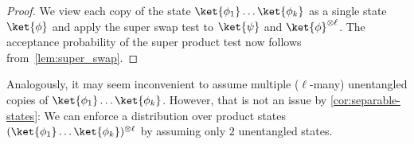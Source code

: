 \begin{proof}
  We view each copy of the state $\ket{\phi_1}\ldots\ket{\phi_k}$ as a single state $\ket{\phi}$
  and apply the super swap test to $\ket{\psi}$ and $\ket{\phi}^{\otimes \ell}$. The acceptance  
  probability of the super product test now follows from~\cref{lem:super_swap}.
\end{proof}

Analogously, it may seem inconvenient to assume multiple ($\ell$-many) unentangled copies of $\ket{\phi_1} \ldots \ket{\phi_k}$.
However, that is not an issue by \cref{cor:separable-states}: We can enforce a distribution over product states $(\ket{\phi_1} \ldots \ket{\phi_k})^{\otimes \ell}$ by assuming only $2$ unentangled states. 
